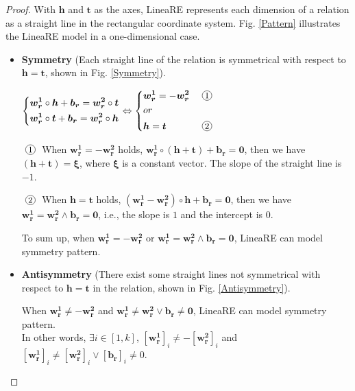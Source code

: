 \documentclass[conference]{IEEEtran}
\newcommand*{\circled}[1]{\lower.7ex\hbox{\tikz\draw (0pt, 0pt)circle (.5em) node {\makebox[1em][c]{\small #1}};}}
\begin{document}
\begin{proof}
	With $\bm{h}$ and $\bm{t}$ as the axes, LineaRE represents each dimension of a relation as a straight line in the rectangular coordinate system. Fig. \ref{Pattern} illustrates the LineaRE model in a one-dimensional case.
	\begin{itemize}
		\item \textbf{Symmetry} (Each straight line of the relation is symmetrical with respect to $\bm{h} = \bm{t}$, shown in Fig. \ref{Symmetry}).
		\begin{flushleft}
			$
			\left\{
			\begin{aligned}
			&\bm{w_r^{1}} \circ \bm{h} + \bm{b_r} = \bm{w_r^{2}} \circ \bm{t}  \\
			&\bm{w_r^{1}} \circ \bm{t} + \bm{b_r} = \bm{w_r^{2}} \circ \bm{h}  \\
			\end{aligned}
			\right.
			\Leftrightarrow
			\left\{
			\begin{aligned}
			&\bm{w_r^{1}} = -\bm{w_r^{2}} &\circled{1}  \\
			&or  \\
			&\bm{h} = \bm{t} &\circled{2} \\
			\end{aligned}
			\right.
			$
		\end{flushleft}
		$\circled{1}$ When
		$\bm{w_r^{1}} = -\bm{w_r^{2}}$ holds, $\bm{w_r^{1}} \circ (\bm{h} + \bm{t}) + \bm{b_r} = \bm{0}$, then we have $(\bm{h} + \bm{t}) = \bm{\xi}$, where $\bm{\xi}$ is a constant vector. The slope of the straight line is $-1$.
		
		$\circled{2}$ When
		$\bm{h} = \bm{t}$ holds, $ (\bm{w_r^{1}} - \bm{w_r^{2}}) \circ \bm{h} + \bm{b_r} = \bm{0}$, then we have
		$\bm{w_r^{1}} = \bm{w_r^{2}} \wedge \bm{b_r} = \bm{0}$, i.e., the slope is $1$ and the intercept is $0$.
		
		To sum up, when
		$\bm{w_r^{1}} = -\bm{w_r^{2}}$
		or
		$\bm{w_r^{1}} = \bm{w_r^{2}} \wedge \bm{b_r} = \bm{0}$,
		LineaRE can model symmetry pattern. \\
		
		\item \textbf{Antisymmetry} (There exist some straight lines not symmetrical with respect to $\bm{h} = \bm{t}$ in the relation, shown in Fig. \ref{Antisymmetry}).
		
		When
		$\bm{w_r^{1}} \neq -\bm{w_r^{2}}$
		and
		$\bm{w_r^{1}} \neq \bm{w_r^{2}} \vee \bm{b_r} \neq \bm{0}$,
		LineaRE can model symmetry pattern. \\
		In other words, $\exists i \in [1, k]$, $[\bm{w_r^{1}}]_i \neq - [\bm{w_r^{2}}]_i$
		and
		$[\bm{w_r^{1}}]_i \neq [\bm{w_r^{2}}]_i \vee [\bm{b_r}]_i \neq 0$.
		

\end{itemize}
\end{proof}
\end{document}
